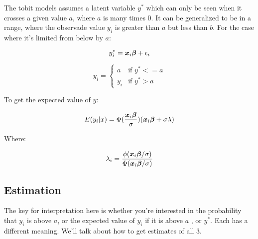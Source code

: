 \documentclass[12 pt]{article}
\begin{document}
The tobit models assumes a latent variable $y^*$ which can only be seen when it crosses a given value $a$, where $a$ is many times 0. It can be generalized to be in a range, where the observade value $y_i$ is greater than $a$ but less than $b$. For the case where it's limited from below by $a$:

\begin{equation}
  \label{eq:5}
 y^*_i=\boldsymbol{x}_i\boldsymbol{\beta} +\epsilon_i
\end{equation}

\begin{equation}
  \label{eq:6}
y_i= \begin{cases}a & \mbox{if } y^*<=a \\
y_i & \mbox{if } y^*>a \end{cases}
\end{equation}

To get the expected value of $y$:

\begin{equation}
  \label{eq:7}
  E(y_i|x)=\Phi(\frac{\boldsymbol{x}_i\boldsymbol{\beta}}{\sigma})(\boldsymbol{x}_i\boldsymbol{\beta} +\sigma \lambda)
\end{equation}

Where:

\begin{equation}
  \label{eq:8}
 \lambda_i=\frac{\phi(\boldsymbol{x}_i\boldsymbol{\beta}/\sigma)}{ \Phi(\boldsymbol{x}_i\boldsymbol{\beta}/\sigma)} 
\end{equation}

\subsection{Estimation}

The key for interpretation here is whether you're interested in the probability that $y_i$ is above $a$, or the expected value of $y_i$ if it is above $a$ , or $y^*$. Each has a different meaning. We'll talk about how to get estimates of all 3. 
\end{document}
